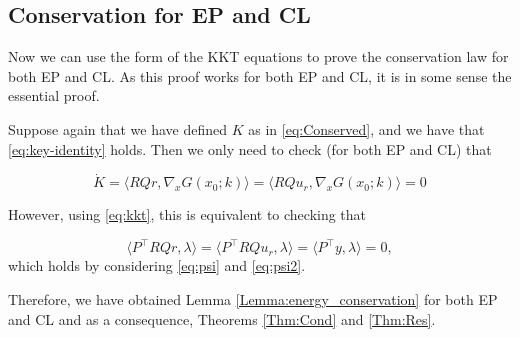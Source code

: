 \documentclass[final, 11pt, nonatbib]{elsarticle}
\theoremstyle{definition}
\theoremstyle{plain}
\numberwithin{equation}{section}
\begin{document}
\subsection{Conservation for EP and CL}
\label{EP and CL C Laws}

Now we can use the form of the KKT equations to prove the conservation law for both EP and CL. As this proof works for both EP and CL, it is in some sense the essential proof. 

Suppose again that we have defined $K$ as in \eqref{eq:Conserved}, and we have that \eqref{eq:key-identity} holds.  Then we only need to check (for both EP and CL) that

\begin{equation}
   \dot{K}=\langle RQr, \nabla_x G(x_0 ;k)\rangle =\langle RQu_r, \nabla_x G(x_0 ;k)\rangle =0
\end{equation}

However, using \eqref{eq:kkt}, this is equivalent to checking that 

\begin{equation}
    \langle P^\top RQr, \lambda \rangle =\langle P^\top RQu_r, \lambda\rangle =\langle P^\top y,\lambda\rangle=0,
\end{equation}
which holds by considering \eqref{eq:psi} and \eqref{eq:psi2}.

Therefore, we have obtained Lemma \ref{Lemma:energy_conservation} for both EP and CL and as a consequence, Theorems \ref{Thm:Cond}
 and \ref{Thm:Res}.

\end{document}
